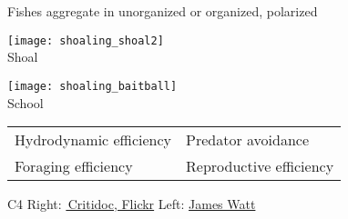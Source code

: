 \documentclass[t]{beamer}
\begin{document}
\begin{frame}[t]{Fishes aggregate in unorganized  or organized, polarized }

\vspace{-\baselineskip}

\begin{multicols}{2}

\texttt{[image: shoaling\_shoal2]}\\
Shoal

\columnbreak

\texttt{[image: shoaling\_baitball]}\\
School



\end{multicols}

\vspace{\baselineskip}

\begin{tabular}{L{0.465\textwidth}L{0.4\textwidth}}
Hydrodynamic efficiency & Predator avoidance \tabularnewline

Foraging efficiency & Reproductive efficiency \tabularnewline

\end{tabular}

\vfilll

C4%
\tiny Right:  \href{https://www.flickr.com/photos/42988059@N02/6868820995/in/album-72157629279028961/}{\textcopyright\,Critidoc, Flickr} \hfill Left: \href{https://en.wikipedia.org/wiki/File:Red_Fish_at_Papah\%C4\%81naumoku\%}{James Watt } %
\end{frame}
\end{document}
